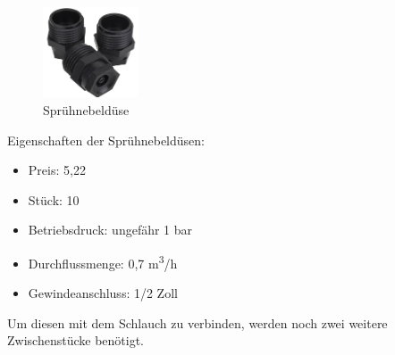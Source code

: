 \begin{figure}[H]
\begin{center}
	\caption{Sprühnebeldüse}
	\includegraphics[width=0.25\textwidth]{fig/Spruehkopf}
\end{center}
\end{figure}

Eigenschaften der Sprühnebeldüsen:

\begin{itemize}
	\item{Preis: 5,22\textsf{\texteuro}}
	\item{Stück: 10}
	\item{Betriebsdruck: ungefähr 1 bar}
	\item{Durchflussmenge: 0,7 m\textsuperscript{3}/h}
	\item{Gewindeanschluss: 1/2 Zoll}
\end{itemize}

Um diesen mit dem Schlauch zu verbinden, werden noch zwei weitere Zwischenstücke benötigt.

